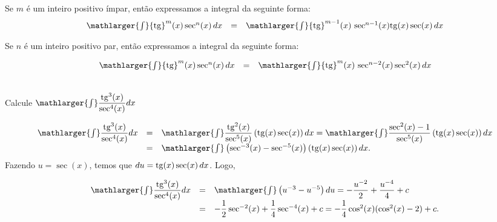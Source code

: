 \cleardoublepage\documentclass[../main.tex]{subfiles}
\begin{document}
\subsubsection[\formula{Integrais do tipo   $\int {\rm tg} ^m (x)\, \sec^n(x)\,dx$}]{}
\begin{compactenum}[i]
\item Se \(m\) é um inteiro positivo ímpar, então expressamos a integral da seguinte forma:
\[ \begin{array}{lcl} \mathlarger{\int} {\rm tg} ^m (x) \sec^n(x)\,dx &=& \mathlarger{\int} {\rm tg} ^{m-1} (x)\, \sec^{n-1}(x) {\rm tg} (x) \sec (x)\,dx\end{array} \]
\item Se \(n\) é um inteiro positivo par, então expressamos a integral da seguinte forma:

\[ \begin{array}{lcl} \mathlarger{\int} {\rm tg}^m (x) \sec^n(x)\,dx &=& \mathlarger{\int} {\rm tg} ^m (x)\, \sec^{n-2}(x) \sec^2 (x)\,dx\\ \end{array} \]
\end{compactenum}

\begin{ex}~
\\Calcule \( \mathlarger{\int}\dfrac{{\rm tg} ^3 (x)}{\sec^4 (x)}dx\)\\

\begin{solution}
\[ \begin{array}{rcl} \mathlarger{\int}\dfrac{{\rm tg}^3(x)}{\sec^4( x)}dx &=& \mathlarger{\int}\dfrac{{\rm tg}^2(x)}{\sec^5(x)}\left({\rm tg}(x) \sec(x)\right)dx = \mathlarger{\int}\dfrac{\sec^2 (x) -1}{\sec^5(x)}\left({\rm tg}(x) \sec(x)\right)dx \\ &=& \mathlarger{\int}\left(\sec^{-3}(x) - \sec^{-5}(x)\right)\left({\rm tg}(x) \sec(x)\right)dx. \end{array} \]
Fazendo \(u=\sec(x) \), temos que \( du={\rm tg}(x) \sec(x)\,dx \). Logo,

\[ \begin{array}{rcl} \mathlarger{\int}\dfrac{{\rm tg}^3(x)}{\sec^4( x)}dx&=&\mathlarger{\int}\left(u^{-3} - u^{-5}\right)du= -\dfrac{u^{-2}}{2} +\dfrac{u^{-4}}{4} +c \\ &=& -\dfrac{1}{2} \sec^{-2}( x) +\dfrac{1}{4} \sec^{-4} (x) +c = -\dfrac{1}{4} \cos^2(x) (\cos^2(x) -2)+c. \end{array} \]
\end{solution}
\end{ex}
\end{document}
